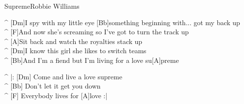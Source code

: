 \begin{song}{Supreme}{Robbie Williams}

\medskip

\begin{guitar}
^ [Dm]I spy with my little eye [Bb]something beginning with... got my back up\\
^ [F]And now she's screaming so I've got to turn the track up\\
^ [A]Sit back and watch the royalties stack up\\
^ [Dm]I know this girl she likes to switch teams\\
^ [Bb]And I'm a fiend but I'm living for a love su[A]preme\\
\end{guitar}


\begin{guitar}
^ |: [Dm]  Come and live a love supreme\\
^ [Bb]  Don't let it get you down\\
^ [F] Everybody lives for [A]love :|\\
\end{guitar}


\end{song}
